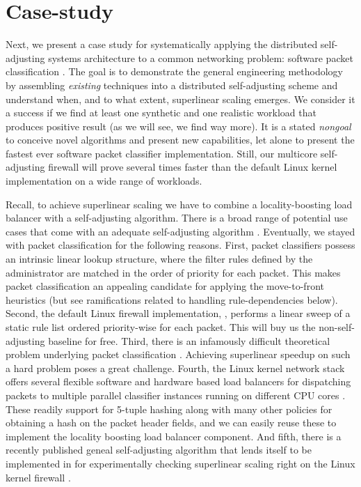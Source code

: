 \section{Case-study }\label{sec:case-study}

Next, we present a case study for systematically applying the distributed self-adjusting systems architecture to a common networking problem: software packet classification \cite{gupta2001algorithms}. The goal is to demonstrate the general engineering methodology by assembling \emph{existing} techniques into a distributed self-adjusting scheme and understand when, and to what extent, superlinear scaling emerges. We consider it a success if we find at least one synthetic and one realistic workload that produces positive result (as we will see, we find way more). It is a stated \emph{nongoal} to conceive novel algorithms and present new capabilities, let alone to present the fastest ever software packet classifier implementation. %
Still, our multicore self-adjusting firewall will prove several times faster than the default Linux kernel implementation on a wide range of workloads.

Recall, to achieve superlinear scaling we have to combine a locality-boosting load balancer with a self-adjusting algorithm. There is a broad range of potential use cases that come with an adequate self-adjusting algorithm \cite{SleatorT85Splay, BentleyCL93, HesterH85, HesterH85, BentleySTW86, Avin0020, ParkM12}. Eventually, we stayed with packet classification for the following reasons.  First, packet classifiers possess an intrinsic linear lookup structure, where the filter rules defined by the administrator are matched in the order of priority for each packet. This makes packet classification an appealing candidate for applying the move-to-front heuristics (but see ramifications related to handling rule-dependencies below). Second, the default Linux firewall implementation, \nftables, performs a linear sweep of a static rule list ordered priority-wise for each packet. This will buy us the non-self-adjusting baseline for free. Third, there is an infamously difficult theoretical problem underlying packet classification \cite{10.1145/2619239.2626294,10.1006/jagm.1996.0063, PacutVAPRS2022, 10.1145/2619239.2626294, 10.1145/1851182.1851208, 10.1145/863955.863980, gupta2001algorithms, 10.1145/3359989.3365431}. Achieving superlinear speedup on such a hard problem poses a great challenge. Fourth, the Linux kernel network stack offers several flexible software and hardware based load balancers for dispatching packets to multiple parallel classifier instances running on different CPU cores \cite{rss-linux}. These readily support for 5-tuple hashing along with many other policies for obtaining a hash on the packet header fields, and we can easily reuse these to implement the locality boosting load balancer component. And fifth, there is a recently published geneal self-adjusting algorithm that lends itself to be implemented in \nftables for experimentally checking superlinear scaling right on the Linux kernel firewall \cite{10228937}.

